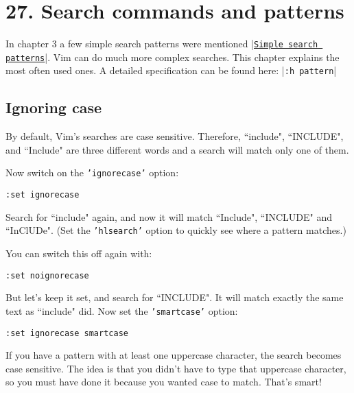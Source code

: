 \section{27. Search commands and patterns}
\label{Search commands and patterns}
In chapter 3 a few simple search patterns were mentioned |\hyperref[Simple search patterns]{\texttt{Simple search patterns}}|.
Vim can do much more complex searches.
This chapter explains the most often used ones.
A detailed specification can be found here: |\texttt{:h pattern}|
\localtableofcontents
\subsection{Ignoring case}
By default, Vim's searches are case sensitive.
Therefore, ``include", ``INCLUDE", and ``Include" are three different words and a search will match only one of them.

Now switch on the \texttt{'ignorecase'} option:

\begin{Verbatim}[samepage=true]
 :set ignorecase
\end{Verbatim}

Search for ``include" again, and now it will match ``Include", ``INCLUDE" and ``InClUDe".
(Set the \texttt{'hlsearch'} option to quickly see where a pattern matches.)

You can switch this off again with:

\begin{Verbatim}[samepage=true]
 :set noignorecase
\end{Verbatim}

But let's keep it set, and search for ``INCLUDE".
It will match exactly the same text as ``include" did.
Now set the \texttt{'smartcase'} option:

\begin{Verbatim}[samepage=true]
 :set ignorecase smartcase
\end{Verbatim}

If you have a pattern with at least one uppercase character, the search becomes case sensitive.
The idea is that you didn't have to type that uppercase character, so you must have done it because you wanted case to match.
That's smart!

